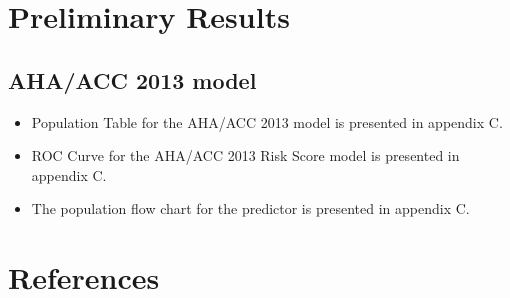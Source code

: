 \documentclass[a4paper,12pt]{article}
\begin{document}
	\section{Preliminary Results}

	\subsection{AHA/ACC 2013 model}
	
	\begin{itemize}
		\item Population Table for the AHA/ACC 2013 model is presented in appendix C.
		\item ROC Curve for the AHA/ACC 2013 Risk Score model is presented in appendix C.
		\item The population flow chart for the predictor is presented in appendix C.
	\end{itemize}
	
	\section{References}
	
   	\printbibliography[heading=none]
   	
\end{document}
